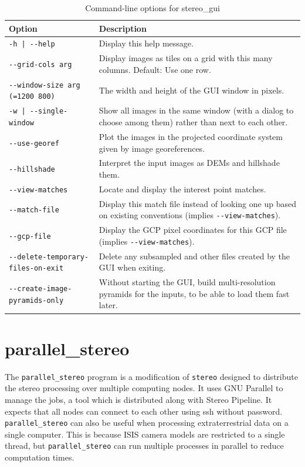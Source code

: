 \begin{longtable}{|l|p{7.5cm}|}
\caption{Command-line options for stereo\_gui}
\label{tbl:stereogui}
\endfirsthead
\endhead
\endfoot
\endlastfoot
\hline
Option & Description \\ \hline \hline
\texttt{-h | -\/-help } & Display this help message.\\ \hline
\texttt{-\/-grid-cols arg} & Display images as tiles on a grid with this many columns. Default: Use one row.\\ \hline
\texttt{-\/-window-size arg (=1200 800)} & The width and height of the GUI window in pixels.\\ \hline
\texttt{-w | -\/-single-window } & Show all images in the same window (with a dialog to choose among them) rather than next to each other.\\ \hline
\texttt{-\/-use-georef} & Plot the images in the projected coordinate system given by image georeferences.\\ \hline
\texttt{-\/-hillshade} & Interpret the input images as DEMs and hillshade them.\\ \hline
\texttt{-\/-view-matches} & Locate and display the interest point matches.\\ \hline
\texttt{-\/-match-file} & Display this match file instead of looking one up based on existing conventions (implies \texttt{-\/-view-matches}). \\ \hline
\texttt{-\/-gcp-file} & Display the GCP pixel coordinates for this GCP file (implies \texttt{-\/-view-matches}). \\ \hline
\texttt{-\/-delete-temporary-files-on-exit} & Delete any subsampled and other files created by the GUI when exiting.\\ \hline
\texttt{-\/-create-image-pyramids-only} & Without starting the GUI, build multi-resolution pyramids for the inputs, to be able to load them fast later.\\ \hline
\end{longtable}

\section{parallel\_stereo}
\label{parallel}

The \texttt{parallel\_stereo} program is a modification of
\texttt{stereo} designed to distribute the stereo processing over
multiple computing nodes. It uses GNU Parallel to manage the jobs, a tool which
is distributed along with Stereo Pipeline. It expects that all nodes
can connect to each other using ssh without password. \texttt{parallel\_stereo}
can also be useful when processing extraterrestrial data on a single computer.
This is because ISIS camera models are restricted to a single thread, but
\texttt{parallel\_stereo} can run multiple processes in parallel to reduce
computation times.

